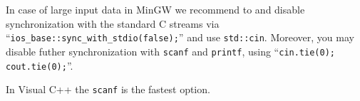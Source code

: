
In case of large input data in MinGW we recommend to
and disable synchronization with the standard C streams
via ``\verb|ios_base::sync_with_stdio(false);|''
and use \verb|std::cin|.
Moreover, you may disable futher synchronization with
\verb|scanf| and \verb|printf|, using ``\verb|cin.tie(0); cout.tie(0);|''.

In Visual C++ the \verb|scanf| is the fastest option.
